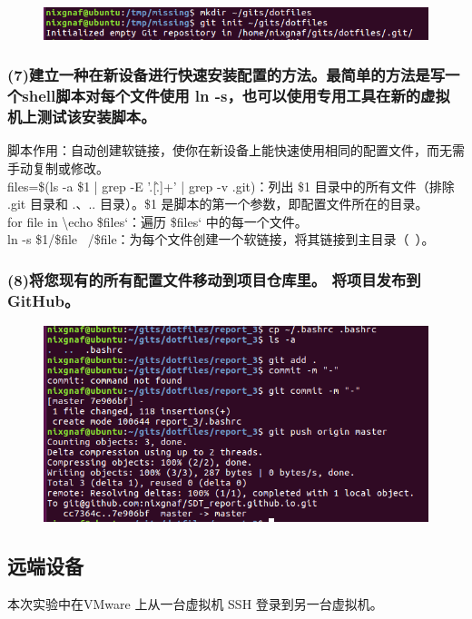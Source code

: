 \documentclass{article}
\begin{document}
\begin{figure}[h]
    \centering
    \includegraphics[width=0.75\linewidth]{image7.png}
\end{figure}

\newpage
\subsubsection{(7)建立一种在新设备进行快速安装配置的方法。最简单的方法是写一个shell脚本对每个文件使用 ln -s，也可以使用专用工具在新的虚拟机上测试该安装脚本。}

\noindent 脚本作用：自动创建软链接，使你在新设备上能快速使用相同的配置文件，而无需手动复制或修改。\\
files=\$(ls -a \$1 | grep -E '.[\^.]+' | grep -v .git)：列出 \$1 目录中的所有文件（排除 .git 目录和 .、.. 目录）。\$1 是脚本的第一个参数，即配置文件所在的目录。\\
for file in \textbackslash echo \$files`：遍历 \$files` 中的每一个文件。\\
ln -s \$1/\$file ~/\$file：为每个文件创建一个软链接，将其链接到主目录（~）。

\subsubsection{(8)将您现有的所有配置文件移动到项目仓库里。 将项目发布到GitHub。}
\begin{figure}[h]
    \centering
    \includegraphics[width=0.7\linewidth]{image8.png}
\end{figure}

\subsection{远端设备}

\noindent 本次实验中在VMware 上从一台虚拟机 SSH 登录到另一台虚拟机。
\end{document}
